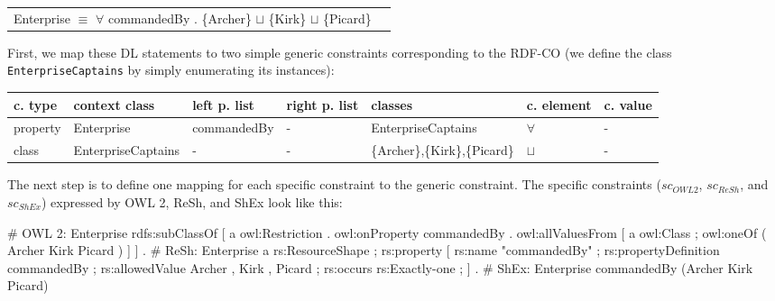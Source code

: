 \documentclass{llncs}
\newcommand{\ms}[1]{\texttt{#1}}
\newenvironment{gcotable}{
  \scriptsize
  \sffamily
  \vspace{0cm}
	\begin{center}
  \begin{tabular}{l|l|l|l|l|l|l}
  \hline
  \textbf{c. type} & \textbf{context class} & \textbf{left p. list} & \textbf{right p. list} & \textbf{classes} & \textbf{c. element} & \textbf{c. value} \\
  \hline

}{
  \hline
  \end{tabular}
	\end{center}
}
\newenvironment{DL}{
  \vspace{0cm}
	\begin{center}
  \begin{tabular}{r l}

}{
  \end{tabular}
	\end{center}
}
\begin{document}

\begin{DL}
Enterprise $\equiv$ $\forall$ commandedBy . \{Archer\} $\sqcup$ \{Kirk\} $\sqcup$ \{Picard\}
\end{DL}

First, we map these DL statements to two simple generic constraints corresponding to the RDF-CO (we define the class \ms{EnterpriseCaptains} by simply enumerating its instances):


\begin{gcotable}
property & Enterprise & commandedBy & - & EnterpriseCaptains & $\forall$ & - \\
class & EnterpriseCaptains & - & - & \{Archer\},\{Kirk\},\{Picard\} & $\sqcup$ & - \\
\end{gcotable}

The next step is to define one mapping for each specific constraint to the generic constraint.
The specific constraints (\ms{$sc_{OWL 2}$}, \ms{$sc_{ReSh}$}, and \ms{$sc_{ShEx}$}) expressed by OWL 2, ReSh, and ShEx look like this:

\begin{ex}
# OWL 2:
Enterprise rdfs:subClassOf [ a owl:Restriction .
    owl:onProperty commandedBy .
    owl:allValuesFrom [ a owl:Class ;
        owl:oneOf ( Archer Kirk Picard ) ] ] .
# ReSh:
Enterprise a rs:ResourceShape ; rs:property [
    rs:name "commandedBy" ; rs:propertyDefinition commandedBy ;
    rs:allowedValue Archer , Kirk , Picard ;
    rs:occurs rs:Exactly-one ; ] .
# ShEx:
Enterprise {
    commandedBy (Archer Kirk Picard) }
\end{ex}
\end{document}
